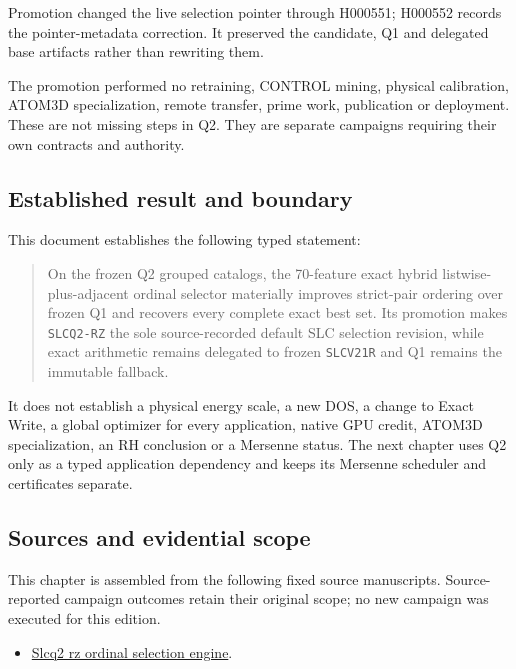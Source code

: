 Promotion changed the live selection pointer through H000551; H000552
records the pointer-metadata correction. It preserved the candidate, Q1
and delegated base artifacts rather than rewriting them.

The promotion performed no retraining, CONTROL mining, physical
calibration, ATOM3D specialization, remote transfer, prime work,
publication or deployment. These are not missing steps in Q2. They are
separate campaigns requiring their own contracts and authority.

\subsection{Established result and
boundary}\label{viii-ch07-established-result-and-boundary}

This document establishes the following typed statement:

\begin{quote}
On the frozen Q2 grouped catalogs, the 70-feature exact hybrid
listwise-plus-adjacent ordinal selector materially improves strict-pair
ordering over frozen Q1 and recovers every complete exact best set. Its
promotion makes \texttt{SLCQ2-RZ} the sole source-recorded default SLC
selection revision, while exact arithmetic remains delegated to frozen
\texttt{SLCV21R} and Q1 remains the immutable fallback.
\end{quote}

It does not establish a physical energy scale, a new DOS, a change to
Exact Write, a global optimizer for every application, native GPU
credit, ATOM3D specialization, an RH conclusion or a Mersenne status.
The next chapter uses Q2 only as a typed application dependency and
keeps its Mersenne scheduler and certificates separate.

\subsection{Sources and evidential
scope}\label{viii-ch07-sources-and-evidential-scope}

This chapter is assembled from the following fixed source manuscripts.
Source-reported campaign outcomes retain their original scope; no new
campaign was executed for this edition.

\begin{itemize}
\tightlist
\item
  \href{https://github.com/iwtbotiwtwot/SAMA/blob/4c2b5dc1649da5900c90b90d0ce56c223dbb7717/vol_iii/02-slc/slcq2-rz-ordinal-selection-engine.md}{Slcq2
  rz ordinal selection engine}.
\end{itemize}
